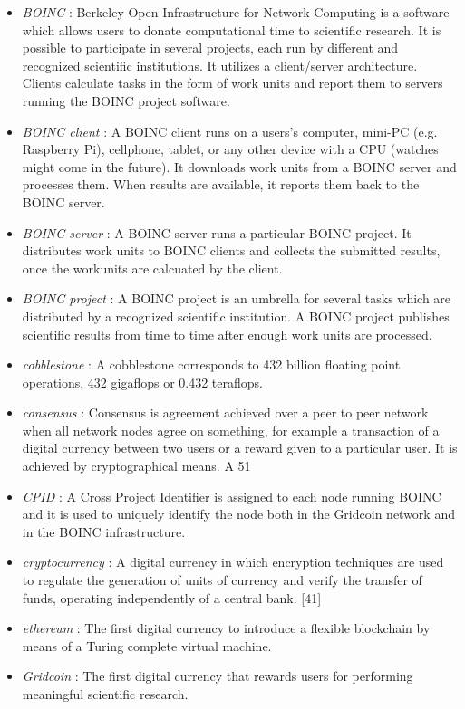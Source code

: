 \begin{itemize}
  \item \textit{BOINC} : Berkeley Open Infrastructure for Network Computing is a software which allows users to donate computational time to scientific research. It is possible to participate in several projects, each run by different and recognized scientific institutions. It utilizes a client/server architecture. Clients calculate tasks in the form of work units and report them to servers running the BOINC project software.
  \item \textit{BOINC client} : A BOINC client runs on a users's computer, mini-PC (e.g. Raspberry Pi), cellphone, tablet, or any other device with a CPU (watches might come in the future). It downloads work units from a BOINC server and processes them. When results are available, it reports them back to the BOINC server.
  \item \textit{BOINC server} : A BOINC server runs a particular BOINC project. It distributes work units to BOINC clients and collects the submitted results, once the workunits are calcuated by the client.
  \item \textit{BOINC project} : A BOINC project is an umbrella for several tasks which are distributed by a recognized scientific institution. A BOINC project publishes scientific results from time to time after enough work units are processed.
  \item \textit{cobblestone} : A cobblestone corresponds to 432 billion floating point operations, 432 gigaflops or 0.432 teraflops.
  \item \textit{consensus} : Consensus is agreement achieved over a peer to peer network when all network nodes agree on something, for example a transaction of a digital currency between two users or a reward given to a particular user. It is achieved by cryptographical means. A 51%
  \item \textit{CPID} : A Cross Project Identifier is assigned to each node running BOINC and it is used to uniquely identify the node both in the Gridcoin network and in the BOINC infrastructure.
  \item \textit{cryptocurrency} : A digital currency in which encryption techniques are used to regulate the generation of units of currency and verify the transfer of funds, operating independently of a central bank. [41]
  \item \textit{ethereum} : The first digital currency to introduce a flexible blockchain by means of a Turing complete virtual machine.
  \item \textit{Gridcoin} : The first digital currency that rewards users for performing meaningful scientific research.

\end{itemize}
